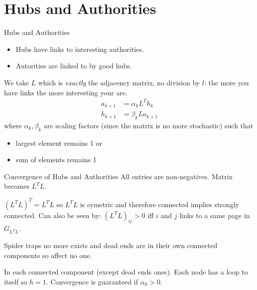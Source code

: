 \documentclass[10pt]{beamer}
\begin{document}
\section{Hubs and Authorities}
\begin{frame}
  \tableofcontents[currentsection]
\end{frame}
\begin{frame}{Hubs and Authorities}
  \begin{itemize}
    \item Hubs have links to interesting authorities.
    \item Autorities are linked to by good hubs.
  \end{itemize}
  We take $L$ which is \emph{exactly} the adjacency matrix, no division by $l$:
  the more you have links the more interesting your are.
  \begin{align*}
    a_{k+1} & = \alpha_k L^T h_k\\
    h_{k+1} & = \beta_k  L a_{k+1}
  \end{align*}
  where $\alpha_k, \beta_k$ are scaling factors (since the matrix is no more stochastic)
  such that
  \begin{itemize}
    \item largest element remains 1 or
    \item sum of elements remains 1
  \end{itemize}
\end{frame}

\begin{frame}{Convergence of Hubs and Authorities}
  All entries are non-negatives.
  Matrix becomes $L^TL$.

  $(L^TL)^T = L^TL$ so $L^TL$ is symetric and therefore connected implies strongly connected.
  Can also be seen by:
  $(L^TL)_{ij} > 0$ iff $i$ and $j$ links to a same page in $G_{L^TL}$.

  Spider traps no more exists and dead ends are in their own connected components so affect no one.

  In each connected component (except dead ends ones).
  Each node has a loop to itself so $h=1$.
  Convergence is guaranteed if $\alpha_0 > 0$.
\end{frame}
\end{document}
